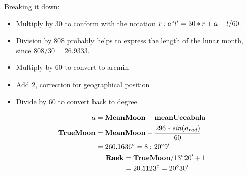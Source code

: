 \documentclass[11pt,oneside]{memoir-article}
\begin{document}
Breaking it down:

\begin{itemize}
\item Multiply by 30 to conform with the notation $r:a^\circ l^\prime = 30*r + a + l/60$.
\item Division by 808 probably helps to express the length of the lunar month, since $808 / 30 = 26.9333$.
\item Multiply by 60 to convert to arcmin
\item Add 2, correction for geographical position
\item Divide by 60 to convert back to degree
\end{itemize}


\begin{align}
\begin{split}
                 a &= \mathbf{MeanMoon} - \mathbf{meanUccabala}\\
 \mathbf{TrueMoon} &= \mathbf{MeanMoon} - \frac{296 * \mathit{sin}(a_{rad})}{60}\\
                   &= 260.1636^\circ = 8:20^\circ 9^\prime
\end{split}\\
\begin{split}
     \mathbf{Raek} &= \mathbf{TrueMoon} / 13^\circ 20^\prime + 1\\
                   &= 20.5123^\circ = 20^\circ 30^\prime
\end{split}
\end{align}
\end{document}
